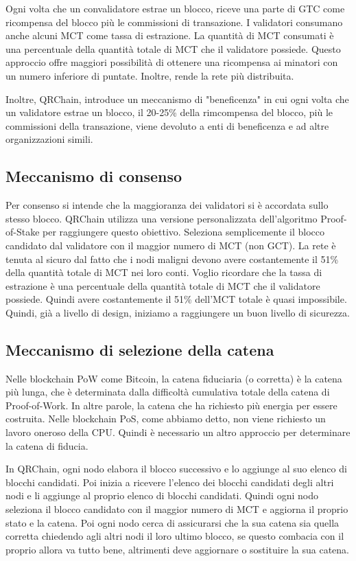 Ogni volta che un convalidatore estrae un blocco, riceve una parte di GTC come ricompensa del blocco più le commissioni di transazione.
I validatori consumano anche alcuni MCT come tassa di estrazione. La quantità di MCT consumati è una percentuale della quantità totale di MCT che il validatore possiede.
Questo approccio offre maggiori possibilità di ottenere una ricompensa ai minatori con un numero inferiore di puntate. Inoltre, rende la rete più distribuita.

Inoltre, QRChain, introduce un meccanismo di "beneficenza" in cui ogni volta che un validatore estrae un blocco, il 20-25\% della rimcompensa del blocco, più le commissioni della transazione, viene devoluto a enti di beneficenza e ad altre organizzazioni simili.

\subsection{Meccanismo di consenso}
Per consenso si intende che la maggioranza dei validatori si è accordata sullo stesso blocco.
QRChain utilizza una versione personalizzata dell'algoritmo Proof-of-Stake per raggiungere questo obiettivo. Seleziona semplicemente il blocco candidato dal validatore con il maggior numero di MCT (non GCT).
La rete è tenuta al sicuro dal fatto che i nodi maligni devono avere costantemente il 51\% della quantità totale di MCT nei loro conti. Voglio ricordare che la tassa di estrazione è una percentuale della quantità totale di MCT che il validatore possiede. Quindi avere costantemente il 51\% dell'MCT totale è quasi impossibile. Quindi, già a livello di design, iniziamo a raggiungere un buon livello di sicurezza.

\subsection{Meccanismo di selezione della catena}
Nelle blockchain PoW come Bitcoin, la catena fiduciaria (o corretta) è la catena più lunga, che è determinata dalla difficoltà cumulativa totale della catena di Proof-of-Work. In altre parole, la catena che ha richiesto più energia per essere costruita.
Nelle blockchain PoS, come abbiamo detto, non viene richiesto un lavoro oneroso della CPU. Quindi è necessario un altro approccio per determinare la catena di fiducia.

In QRChain, ogni nodo elabora il blocco successivo e lo aggiunge al suo elenco di blocchi candidati. Poi inizia a ricevere l'elenco dei blocchi candidati degli altri nodi e li aggiunge al proprio elenco di blocchi candidati.
Quindi ogni nodo seleziona il blocco candidato con il maggior numero di MCT e aggiorna il proprio stato e la catena.
Poi ogni nodo cerca di assicurarsi che la sua catena sia quella corretta chiedendo agli altri nodi il loro ultimo blocco, se questo combacia con il proprio allora va tutto bene, altrimenti deve aggiornare o sostituire la sua catena.

